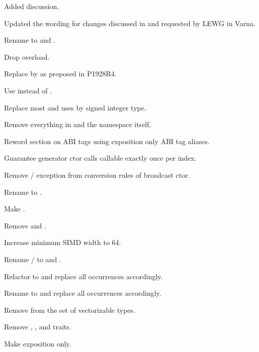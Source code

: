 \begin{revision}
\item Added  discussion.
\end{revision}

\begin{revision}
\item Updated the wording for changes discussed in and requested by LEWG in Varna.
\item Rename to  and .
\item Drop  overload.
\item Replace  by  as proposed in P1928R4.
\item Use  instead of .
\item Replace most  and  uses by  signed integer type.
\item Remove everything in  and the namespace itself.
\item Reword section on ABI tags using exposition only ABI tag aliases.
\item Guarantee generator ctor calls callable exactly once per index.
\item Remove / exception from conversion rules of broadcast ctor.
\item Rename  to .
\item Make  .
\item Remove  and .
\item Increase minimum SIMD width to 64.
\item Rename / to  and .
\item Refactor  to  and replace all occurrences accordingly.
\item Rename  to  and replace all occurrences accordingly.
\item Remove  from the set of vectorizable types.
\item Remove , , and  traits.
\item Make  exposition only.
\end{revision}


